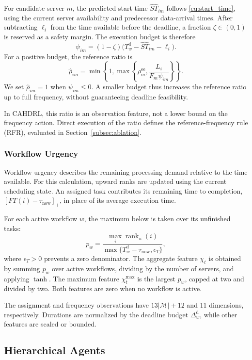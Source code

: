 \documentclass[journal]{IEEEtran}
\begin{document}
For candidate server $m$, the predicted start time $\widehat{ST}_{im}$ follows \eqref{eq:start_time}, using the current server availability and predecessor data-arrival times. After subtracting $\ell_i$ from the time available before the deadline, a fraction $\zeta\in(0,1)$ is reserved as a safety margin. The execution budget is therefore
\[
    \psi_{im}=(1-\zeta)
    \big(T_w^{\mathrm d}-\widehat{ST}_{im}-\ell_i\big).
\]
For a positive budget, the reference ratio is
\[
    \widehat\rho_{im}
    =
    \min\!\left\{1,\max\!\left\{
        \rho_m^{\mathrm{ee}},
        \frac{L_i}{F_m\psi_{im}}
    \right\}\right\}.
\]
We set $\widehat\rho_{im}=1$ when $\psi_{im}\leq0$. A smaller budget thus increases the reference ratio up to full frequency, without guaranteeing deadline feasibility.

In CAHDRL, this ratio is an observation feature, not a lower bound on the frequency action. Direct execution of the ratio defines the reference-frequency rule (RFR), evaluated in Section~\ref{subsec:ablation}.

\subsubsection{Workflow Urgency}

Workflow urgency describes the remaining processing demand relative to the time available. For this calculation, upward ranks are updated using the current scheduling state. An assigned task contributes its remaining time to completion, $[FT(i)-\tau_{\mathrm{now}}]_+$, in place of its average execution time.

For each active workflow $w$, the maximum below is taken over its unfinished tasks:
\[
    p_w=
    \frac{\max_i\operatorname{rank}_u(i)}
         {\max\{T_w^{\mathrm d}-\tau_{\mathrm{now}},
                \epsilon_T\}},
\]
where $\epsilon_T>0$ prevents a zero denominator. The aggregate feature $\chi_t$ is obtained by summing $p_w$ over active workflows, dividing by the number of servers, and applying $\tanh$. The maximum feature $\chi_t^{\max}$ is the largest $p_w$, capped at two and divided by two. Both features are zero when no workflow is active.

The assignment and frequency observations have $13|\mathcal M|+12$ and 11 dimensions, respectively. Durations are normalized by the deadline budget $\Delta_w^{\mathrm d}$, while other features are scaled or bounded.

\subsection{Hierarchical Agents}
\label{subsec:agents}
\end{document}
